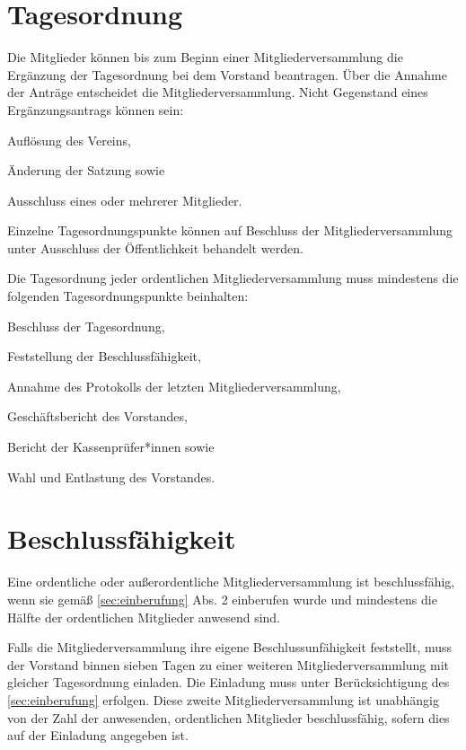 \section{Tagesordnung}
\begin{absätze}
    \item Die Mitglieder können bis zum Beginn einer Mitgliederversammlung die Ergänzung der Tagesordnung bei dem Vorstand beantragen. Über die Annahme der Anträge entscheidet die Mitgliederversammlung. Nicht Gegenstand eines Ergänzungsantrags können sein:
    \begin{sätze}
        \item Auflösung des Vereins,
        \item Änderung der Satzung sowie
        \item Ausschluss eines oder mehrerer Mitglieder.
    \end{sätze}
    \item Einzelne Tagesordnungspunkte können auf Beschluss der Mitgliederversammlung unter Ausschluss der Öffentlichkeit behandelt werden.
    \item Die Tagesordnung jeder ordentlichen Mitgliederversammlung muss mindestens die folgenden Tagesordnungspunkte beinhalten:
    \begin{sätze}
        \item Beschluss der Tagesordnung,
        \item Feststellung der Beschlussfähigkeit,
        \item Annahme des Protokolls der letzten Mitgliederversammlung,
        \item Geschäftsbericht des Vorstandes,
        \item Bericht der Kassenprüfer*innen sowie
        \item Wahl und Entlastung des Vorstandes.
    \end{sätze}
\end{absätze}

\section{Beschlussfähigkeit}
\begin{absätze}
    \item Eine ordentliche oder außerordentliche Mitgliederversammlung ist beschlussfähig, wenn sie gemäß \ref{sec:einberufung} Abs. 2 einberufen wurde und mindestens die Hälfte der ordentlichen Mitglieder anwesend sind.
    \item Falls die Mitgliederversammlung ihre eigene Beschlussunfähigkeit feststellt, muss der Vorstand binnen sieben Tagen zu einer weiteren Mitgliederversammlung mit gleicher Tagesordnung einladen. Die Einladung muss unter Berücksichtigung des \ref{sec:einberufung} erfolgen. Diese zweite Mitgliederversammlung ist unabhängig von der Zahl der anwesenden, ordentlichen Mitglieder beschlussfähig, sofern dies auf der Einladung angegeben ist.
\end{absätze}

